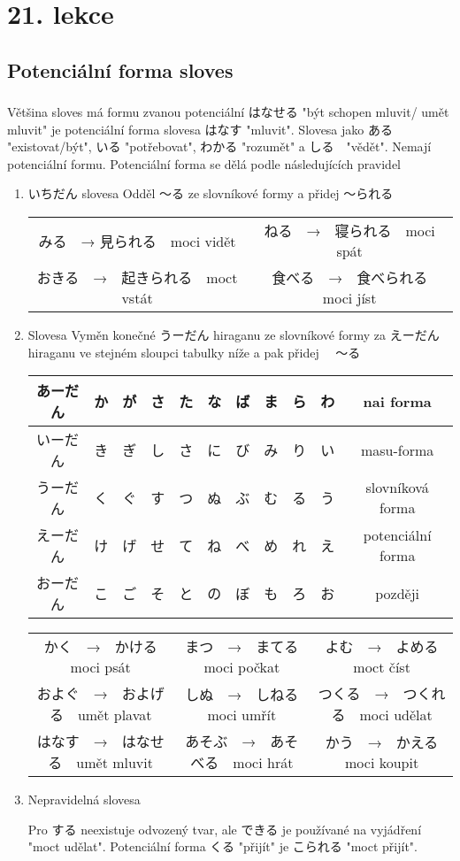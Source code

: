 \section{21. lekce}

\subsection{Potenciální forma sloves}
\subsubsection{} Většina sloves má formu zvanou potenciální はなせる		"být schopen mluvit/ umět mluvit" je potenciální forma slovesa 	はなす	"mluvit". Slovesa jako ある	"existovat/být", 	いる	"potřebovat", 	わかる	"rozumět" a 	しる　"vědět". Nemají potenciální formu. Potenciální forma se dělá podle následujících pravidel 

\begin{enumerate}
\item  いちだん	slovesa
Odděl 〜る	 ze slovníkové formy a přidej 	〜られる	

\begin{tabular}{cc}
みる　→  見られる　moci vidět& ねる　→　寝られる　moci spát\\
おきる　→　起きられる　moct vstát& 食べる　→　食べられる　moci jíst\\
\end{tabular}

\item 	Slovesa
Vyměn konečné 	うーだん	hiraganu ze slovníkové formy za 	えーだん　hiraganu ve stejném sloupci tabulky níže a pak přidej 　〜る

\begin{tabular}{|c|c|c|c|c|c|c|c|c|c||c}
\hline
あーだん&か&が&さ&た&な&ば&ま&ら&わ& nai forma\\
\hline
いーだん&き&ぎ&し&さ&に&び&み&り&い& masu-forma\\
\hline
うーだん&く&ぐ&す&つ&ぬ&ぶ&む&る&う& slovníková forma\\
\hline
えーだん&け&げ&せ&て&ね&べ&め&れ&え& potenciální forma\\
\hline
おーだん&こ&ご&そ&と&の&ぼ&も&ろ&お& později\\
\hline
\end{tabular}

\begin{tabular}{ccc}
かく　→　かける　moci psát&まつ　→　まてる　moci počkat&よむ　→　よめる　moct číst\\
およぐ　→　およげる　umět plavat&しぬ　→　しねる　moci umřít&つくる　→　つくれる　moci udělat\\
はなす　→　はなせる　umět mluvit&あそぶ　→　あそべる　moci hrát&かう　→　かえる　moci koupit\\
\end{tabular}

\item Nepravidelná slovesa

Pro 	する	neexistuje odvozený tvar, ale 	できる	je používané na vyjádření "moct udělat". Potenciální forma 	くる	"přijít" je 	こられる	"moct přijít".

\end{enumerate}

